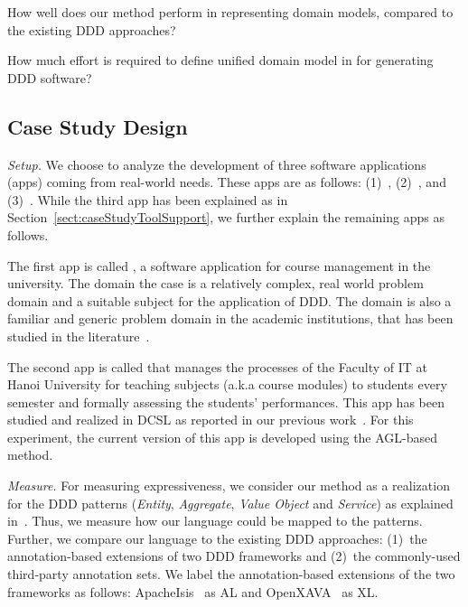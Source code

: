 \begin{description}[labelindent=0.5cm,leftmargin=0.5cm]
%
\item[\textbf{RQ1.}] How well does our method perform in representing domain models, compared to the existing DDD approaches?
%
\item[\textbf{RQ2.}] How much effort is required to define unified domain model in \agldcsl for generating DDD software?
%
%
\end{description}
 
\subsection{Case Study Design}
\label{subsect:caseDesign} 

\noindent \textit{Setup.} We choose to analyze the development of three software applications (apps) coming from real-world needs. These apps are as follows: (1)~\courseman, (2)~\processman, and (3)~\orderman. While the third app has been explained as in Section~\ref{sect:caseStudyToolSupport}, we further explain the remaining apps as follows.	

The first app is called \courseman, a software application for course management in the university. The domain \wrt the case is a relatively complex, real world problem domain and a suitable subject for the application of DDD. The domain is also a familiar and generic problem domain in the academic institutions, that has been studied in the literature~\cite{ajanovskiIntegrationCourseEnrolment2013,omahonyRecommenderSystemOnline2007,le_domain_2018}.

The second app is called \processman that manages the processes of the Faculty of IT at Hanoi University for teaching subjects (a.k.a course modules) to students every semester and formally assessing the students’ performances. This app has been studied and realized in DCSL as reported in our previous work~\cite{le_generative_2018}. For this experiment, the current version of this app is developed using the AGL-based method.

\vspace{0.1cm}
\noindent\textit{Measure.} For measuring expressiveness, we consider our method as a realization for the DDD patterns (\textit{Entity}, \textit{Aggregate}, \textit{Value Object} and \textit{Service}) as explained in~\cite{evans_domain-driven_2004}. Thus, we measure how our language could be mapped to the patterns. Further, we compare our language to the existing DDD approaches: (1)~the annotation-based extensions of two DDD frameworks and (2)~the commonly-used third-party annotation sets. We label the annotation-based extensions of the two frameworks as follows: ApacheIsis~\cite{apache-s.f_apache_2016} as AL and OpenXAVA~\cite{noauthor_openxava_2016} as XL. 

